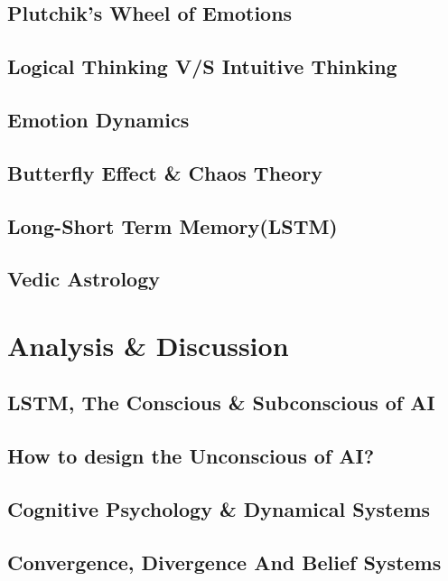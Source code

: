 \documentclass{IEEEtran}
\begin{document}
\begin{multicols}{2}
		\subsection{Plutchik's Wheel of Emotions}
		
		\subsection{Logical Thinking V/S Intuitive Thinking}
		
		\subsection{Emotion Dynamics}
		
		\subsection{Butterfly Effect \& Chaos Theory}
		
		\subsection{Long-Short Term Memory(LSTM)}
		
		\subsection{Vedic Astrology}
		
		\section{Analysis \& Discussion}
		\subsection{LSTM, The Conscious \& Subconscious of AI}
		\subsection{How to design the Unconscious of AI?}
		\subsection{Cognitive Psychology \& Dynamical Systems}
		
		\subsection{Convergence, Divergence And Belief Systems}
		

\end{multicols}
\end{document}
